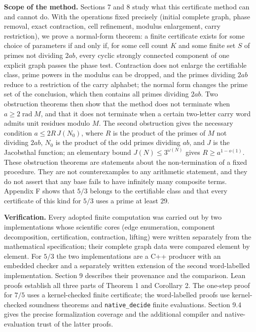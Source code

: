 \documentclass[11pt,reqno]{amsart}
\theoremstyle{definition}
\theoremstyle{remark}
\begin{document}
\textbf{Scope of the method.} Sections 7 and 8 study what this certificate
method can and cannot do. With the operations fixed precisely (initial
complete graph, phase removal, exact contraction, cell refinement,
modulus enlargement, carry restriction), we prove a normal-form theorem:
a finite certificate exists for some choice of parameters if and only if,
for some cell count \(K\) and some finite set \(S\) of primes not dividing
\(2ab\), every cyclic strongly connected component of one explicit graph
passes the phase test. Contraction does not enlarge the certifiable
class, prime powers in the modulus can be dropped, and the primes dividing
\(2ab\) reduce to a restriction of the carry alphabet; the normal form
changes the prime set of the conclusion, which then contains all primes
dividing \(2ab\). Two obstruction theorems then show that the method
does not terminate when \(a\ge2\operatorname{rad}M\), and that it does
not terminate when a certain two-letter carry word admits unit residues
modulo \(M\). The second obstruction gives the necessary condition
\(a\le2R\,J(N_0)\), where \(R\) is the product of the primes of \(M\)
not dividing \(2ab\), \(N_0\) is the product of the odd primes dividing
\(ab\), and \(J\) is the Jacobsthal function; an elementary bound
\(J(N)\le3^{\omega(N)}\) gives \(R\ge a^{1-o(1)}\). These obstruction
theorems are statements about the non-termination of a fixed procedure.
They are not counterexamples to any arithmetic statement, and they do not
assert that any base fails to have infinitely many composite terms.
Appendix F shows that \(5/3\) belongs to the certifiable class and that
every certificate of this kind for \(5/3\) uses a prime at least \(29\).

\textbf{Verification.} Every adopted finite computation was carried out by two
implementations whose scientific cores (edge enumeration, component
decomposition, certification, contraction, lifting) were written
separately from the mathematical specification; their complete graph
data were compared element by element. For \(5/3\) the two
implementations are a C++ producer with an embedded checker and a
separately written extension of the second word-labelled implementation.
Section 9 describes their
provenance and the comparison. Lean proofs establish all three parts of
Theorem 1 and Corollary 2. The one-step proof for \(7/5\) uses a
kernel-checked finite certificate; the word-labelled proofs use
kernel-checked soundness theorems and \nolinkurl{native_decide} finite
evaluations. Section 9.4 gives the precise formalization coverage and
the additional compiler and native-evaluation trust of the latter
proofs.
\end{document}

